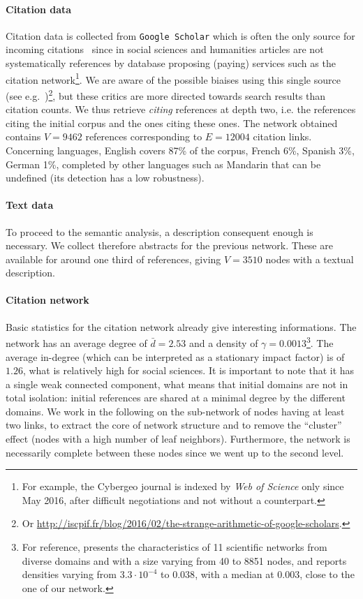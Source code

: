 \documentclass[galley]{jtlu-article-2col}
\begin{document}
\paragraph{Citation data}

Citation data is collected from \texttt{Google Scholar} which is often the only source for incoming citations~\cite{noruzi2005google} since in social sciences and humanities articles are not systematically references by database proposing (paying) services such as the citation network\footnote{For example, the Cybergeo journal is indexed by \textit{Web of Science} only since May 2016, after difficult negotiations and not without a counterpart.}. We are aware of the possible biaises using this single source (see e.g.~\cite{bohannon2014scientific})\footnote{Or \url{http://iscpif.fr/blog/2016/02/the-strange-arithmetic-of-google-scholars}.}, but these critics are more directed towards search results than citation counts. We thus retrieve \emph{citing} references at depth two, i.e. the references citing the initial corpus and the ones citing these ones. The network obtained contains $V=9462$ references corresponding to $E=12004$ citation links. Concerning languages, English covers 87\% of the corpus, French 6\%, Spanish 3\%, German 1\%, completed by other languages such as Mandarin that can be undefined (its detection has a low robustness).

\paragraph{Text data}

To proceed to the semantic analysis, a description consequent enough is necessary. We collect therefore abstracts for the previous network. These are available for around one third of references, giving $V=3510$ nodes with a textual description.

\paragraph{Citation network}

Basic statistics for the citation network already give interesting informations. The network has an average degree of $\bar{d}=2.53$ and a density of $\gamma=0.0013$\footnote{For reference, \cite{batagelj2003efficient} presents the characteristics of 11 scientific networks from diverse domains and with a size varying from 40 to 8851 nodes, and reports densities varying from $3.3\cdot 10^{-4}$ to $0.038$, with a median at $0.003$, close to the one of our network.}. The average in-degree (which can be interpreted as a stationary impact factor) is of $1.26$, what is relatively high for social sciences. It is important to note that it has a single weak connected component, what means that initial domains are not in total isolation: initial references are shared at a minimal degree by the different domains. We work in the following on the sub-network of nodes having at least two links, to extract the core of network structure and to remove the ``cluster'' effect (nodes with a high number of leaf neighbors). Furthermore, the network is necessarily complete between these nodes since we went up to the second level.
\end{document}
